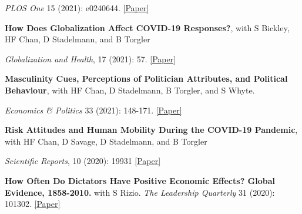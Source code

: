 \documentclass[letterpaper]{article}
\renewenvironment{itemize}{
  \begin{list}{}{
    \setlength{\leftmargin}{1.5em}
  }
}{
  \end{list}
}
\begin{document}
\begin{itemize}
	\vspace{-0.05in}
	
	
	\item \textit{PLOS One} 15 (2021): e0240644.  \href{https://psyarxiv.com/86qxu/}{[Paper]}
	
\medskip	
	
	\item \textbf{How Does Globalization Affect COVID-19 Responses?}, with S Bickley, HF Chan, D Stadelmann, and B Torgler 

\vspace{-0.05in}

\item \textit{Globalization and  Health}, 17 (2021): 57. \href{https://globalizationandhealth.biomedcentral.com/articles/10.1186/s12992-021-00677-5}{[Paper]}


	\medskip
	
	\item \textbf{Masculinity Cues, Perceptions of Politician Attributes, and Political Behaviour}, with HF Chan, D Stadelmann, B Torgler, and S Whyte. 
	
	\vspace{-0.05in}

		\item \textit{Economics \& Politics} 33 (2021): 148-171. \href{xhttps://drive.google.com/file/d/1bwZzZJuU1phzjWLgCkL2H-tYz_4uJnxC/view?usp=sharing}{[Paper]}


		\medskip
		
		\item {\bf Risk Attitudes and Human Mobility During the
	COVID-19 Pandemic}, with HF Chan, D Savage, D Stadelmann, and B Torgler
	\vspace{-0.05in}

\item \textit{Scientific Reports}, 10 (2020): 19931 
\href{http://www.crema-research.ch/papers/2020-06.pdf}{[Paper]}

	\medskip
		
	\item \textbf{How Often Do Dictators Have Positive Economic Effects? Global Evidence, 1858-2010.} with S Rizio.
	 \textit{The Leadership Quarterly} 31 (2020): 101302. \href{https://drive.google.com/file/d/1gSZX3oPnJ9YWZwG0Px_6KRd62K9ZNPrj/view}{[Paper]}
	 	

\end{itemize}
\end{document}
